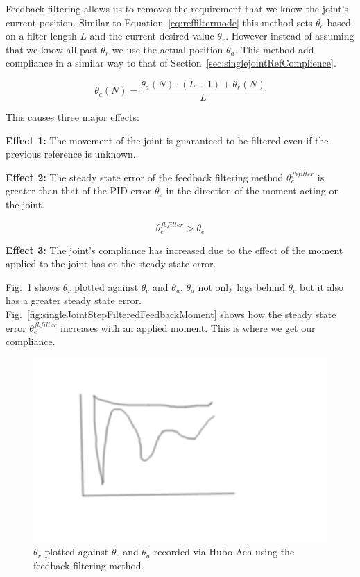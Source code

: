 Feedback filtering allows us to removes the requirement that we know the joint's current position.
Similar to Equation~\ref{eq:reffiltermode} this method sets $\theta_c$ based on a filter length $L$ and the current desired value $\theta_r$.
However instead of assuming that we know all past $\theta_r$ we use the actual position $\theta_a$.
This method add compliance in a similar way to that of Section~\ref{sec:singlejointRefComplience}.


\begin{equation}\label{eq:refencmode}
\theta_c(N) = \frac{\theta_a(N)\cdot\left(L-1\right) + \theta_r(N)}{L}
\end{equation}

This causes three major effects: 

\noindent \textbf{Effect 1:} The movement of the joint is guaranteed to be filtered even if the previous reference is unknown.

\noindent \textbf{Effect 2:} The steady state error of the feedback filtering method $\theta_e^{fbfilter}$ is greater than that of the PID error $\theta_e$ in the direction of the moment acting on the joint.

\begin{equation}
\theta_e^{fbfilter} > \theta_e
\end{equation}

\noindent \textbf{Effect 3:} The joint's compliance has increased due to the effect of the moment applied to the joint has on the steady state error.



Fig.~\ref{fig:singleJointStepFilteredFeedback} shows $\theta_r$ plotted against $\theta_c$ and $\theta_a$.  
$\theta_a$ not only lags behind $\theta_c$ but it also has a greater steady state error.
Fig.~\ref{fig:singleJointStepFilteredFeedbackMoment} shows how the steady state error $\theta_e^{fbfilter}$ increases with an applied moment.
This is where we get our compliance.

\begin{figure}[thpb]
  \centering
\includegraphics[width=0.8\columnwidth]{./pix/tmp.png}
  \caption{$\theta_r$ plotted against $\theta_c$ and $\theta_a$ recorded via Hubo-Ach using the feedback filtering method.}
  \label{fig:singleJointStepFilteredFeedback}
\end{figure}

